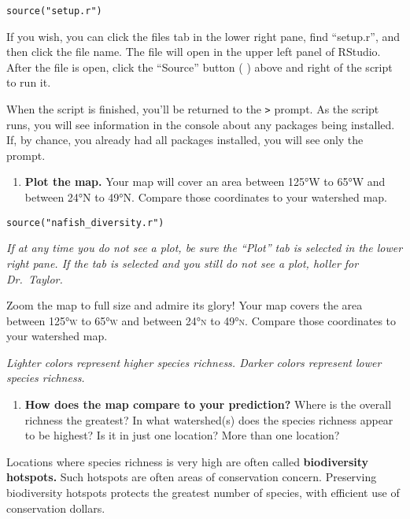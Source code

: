\documentclass[11pt]{article}
\begin{document}
\begin{verbatim}
source("setup.r")
\end{verbatim}

If you wish, you can click the files tab in the lower right pane, find “setup.r”, and then click the file name. The file will open in the upper left panel of RStudio. After the file is open, click the “Source” button  (\,\,) above and right of the script to run it.


When the script is finished, you'll be returned to the \texttt{>} prompt. As the script runs, you will see information in the console about any packages being installed. If, by chance, you already had all packages installed, you will see only the prompt.

\begin{enumerate}[resume]
\item \textbf{Plot the map.} Your map will cover
an area between 125°W to 65°W and between 24°N to 49°N. Compare those
coordinates to your watershed map.
\end{enumerate}


\begin{verbatim}
source("nafish_diversity.r") 
\end{verbatim}

\textit{If at any time you do not see a plot, be sure the “Plot” tab is selected in the lower right pane. If the tab is selected and you still do not see a plot, holler for Dr.~Taylor.}

Zoom the map to full size and admire its glory! Your map covers
the area between 125°\textsc{w} to 65°\textsc{w} and between 24°\textsc{n} to 49°\textsc{n.} Compare those
coordinates to your watershed map. 

\textit{Lighter colors represent higher species richness. Darker colors represent lower species richness.}


\begin{enumerate}[resume]
\item \textbf{How does the map compare to your prediction?} Where is the overall
richness the greatest? In what watershed(s) does the species richness appear to be highest? Is it in just one location? More than one location?\vspace{10\baselineskip}
\end{enumerate}

Locations where species richness is very high are often called
\textbf{biodiversity hotspots.} Such hotspots are often areas of conservation
concern. Preserving biodiversity hotspots protects the greatest number
of species, with efficient use of conservation dollars.
\end{document}
